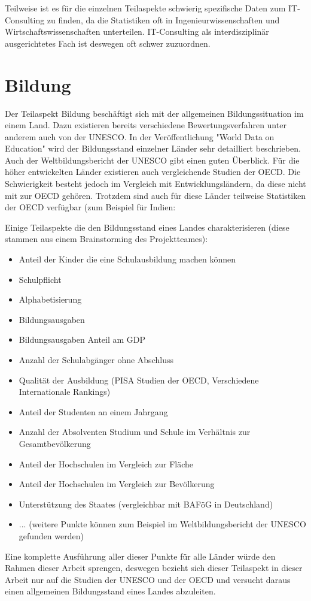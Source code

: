 Teilweise ist es für die einzelnen Teilaspekte schwierig spezifische Daten zum IT-Consulting zu finden, da die Statistiken oft in Ingenieurwissenschaften und Wirtschaftswissenschaften unterteilen. IT-Consulting als interdisziplinär ausgerichtetes Fach ist deswegen oft schwer zuzuordnen.

\section{Bildung}
Der Teilaspekt Bildung beschäftigt sich mit der allgemeinen Bildungssituation im einem Land. Dazu existieren bereits verschiedene  Bewertungsverfahren unter anderem auch von der UNESCO. In der Veröffentlichung "World Data on Education" \cite{unesco2} wird der Bildungsstand einzelner Länder sehr detailliert beschrieben. Auch der Weltbildungsbericht der UNESCO \cite{unesco1} gibt einen guten Überblick. 
Für die höher entwickelten Länder existieren auch vergleichende Studien der OECD. Die Schwierigkeit besteht jedoch im Vergleich mit Entwicklungsländern, da diese nicht mit zur OECD gehören. Trotzdem sind auch für diese Länder teilweise Statistiken der OECD verfügbar (zum Beispiel für Indien: \cite{oecd}

Einige Teilaspekte die den Bildungsstand eines Landes charakterisieren (diese stammen aus einem Brainstorming des Projektteames):
\begin{itemize} 
\item Anteil der Kinder die eine Schulausbildung machen können
\item Schulpflicht
\item Alphabetisierung
\item Bildungsausgaben
\item Bildungsausgaben Anteil am GDP
\item Anzahl der Schulabgänger ohne Abschluss
\item Qualität der Ausbildung (PISA Studien der OECD, Verschiedene Internationale Rankings)
\item Anteil der Studenten an einem Jahrgang
\item Anzahl der Absolventen Studium und Schule im Verhältnis zur Gesamtbevölkerung
\item Anteil der Hochschulen im Vergleich zur Fläche
\item Anteil der Hochschulen im Vergleich zur Bevölkerung
\item Unterstützung des Staates (vergleichbar mit BAFöG in Deutschland)
\item ... (weitere Punkte können zum Beispiel im Weltbildungsbericht der UNESCO gefunden werden)
\end{itemize}
Eine komplette Ausführung aller dieser Punkte für alle Länder würde den Rahmen dieser Arbeit sprengen, deswegen bezieht sich dieser Teilaspekt in dieser Arbeit nur auf die Studien der UNESCO und der OECD und versucht daraus einen allgemeinen Bildungsstand eines Landes abzuleiten.

